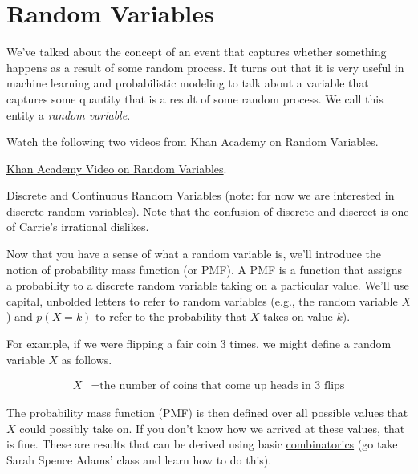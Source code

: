 \documentclass[assignment01_Solutions]{subfiles}
\begin{document}
\section{Random Variables}

We've talked about the concept of an event that captures whether something happens as a result of some random process.  It turns out that it is very useful in machine learning and probabilistic modeling to talk about a variable that captures some quantity that is a result of some random process.  We call this entity a \emph{random variable}.

\begin{externalresources}[(20 minutes)]
Watch the following two videos from Khan Academy on Random Variables.
\bi
\item \href{https://www.khanacademy.org/math/statistics-probability/random-variables-stats-library/random-variables-discrete/v/random-variables}{Khan Academy Video on Random Variables}.
\item \href{https://www.khanacademy.org/math/statistics-probability/random-variables-stats-library/random-variables-discrete/v/discrete-and-continuous-random-variables}{Discrete and Continuous Random Variables} (note: for now we are interested in discrete random variables). Note that the confusion of discrete and discreet is one of Carrie's irrational dislikes.
\ei
\end{externalresources}

Now that you have a sense of what a random variable is, we'll introduce the notion of probability mass function (or PMF).  A PMF is a function that assigns a probability to a discrete random variable taking on a particular value.  We'll use capital, unbolded letters to refer to random variables (e.g., the random variable $X$) and $p(X = k)$ to refer to the probability that $X$ takes on value $k$).

For example, if we were flipping a fair coin 3 times, we might define a random variable $X$ as follows.

\begin{align}
X&= \mbox{the number of coins that come up heads in 3 flips}
\end{align}

The probability mass function (PMF) is then defined over all possible values that $X$ could possibly take on.  If you don't know how we arrived at these values, that is fine.  These are results that can be derived using basic \href{https://en.wikipedia.org/wiki/Combinatorics}{combinatorics} (go take Sarah Spence Adams' class and learn how to do this).
\end{document}

